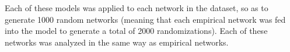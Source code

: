 Each of these models was applied to each network in the dataset, so as to
generate 1000 random networks (meaning that each empirical network was fed
into the model to generate a total of 2000 randomizations). Each of these
networks was analyzed in the same way as empirical networks.
